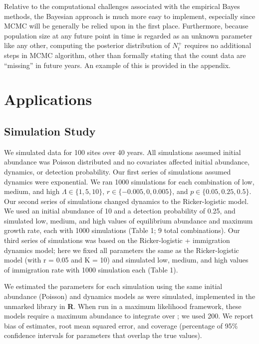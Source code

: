 \documentclass[12pt]{article}
\begin{document}
Relative to the computational challenges associated with the
empirical Bayes methods, the Bayesian approach is much more easy to
implement, especially since MCMC will be generally be relied upon in the
first place. Furthermore, because population size at any future point
in time is regarded as an unknown parameter like any other, computing the
posterior distribution of $N^+_t$ requires no additional steps
in MCMC algorithm, other than formally stating that the count data are
``missing'' in future years. An example of this is provided in the appendix.



\section{Applications}
\label{sec:app}

\subsection{Simulation Study}


We simulated data for 100 sites over 40 years.  All
simulations assumed initial abundance was Poisson distributed
and no covariates affected initial abundance, dynamics, or
detection probability.  Our first series of simulations
assumed dynamics were exponential.  We ran 1000 simulations for
each combination of low, medium, and high $\Lambda \in
\{1,5,10\}$, $r \in \{-0.005, 0, 0.005\}$, and
$p \in \{0.05, 0.25, 0.5\}$. %
Our second series of simulations changed dynamics to the Ricker-logistic
model. We used an initial abundance of 10 and a detection probability
of 0.25, and simulated low, medium, and high values of equilibrium
abundance and maximum growth rate, each with 1000 simulations (Table 1;
9 total combinations). Our third series of simulations was based
on the Ricker-logistic + immigration dynamics model; here we fixed all
parameters the same as the Ricker-logistic model (with r = 0.05 and K = 10) and
simulated low, medium, and high values of immigration rate with 1000
simulation each (Table 1).

We estimated the parameters for each simulation using the same
initial abundance (Poisson) and dynamics models as were
simulated, implemented in the unmarked library in \textbf{R}.
When run in a maximum likelihood framework, these models require a
maximum abundance to integrate over
\citep{royle:2004biom,dail_madsen:2011};
we used 200.  We report bias of estimates, root
mean squared error, and coverage (percentage of 95\% confidence
intervals for parameters that overlap the true values).
\end{document}
